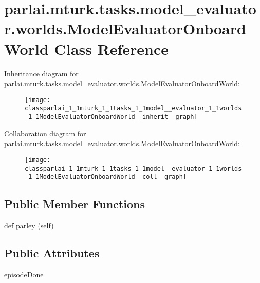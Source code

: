 \hypertarget{classparlai_1_1mturk_1_1tasks_1_1model__evaluator_1_1worlds_1_1ModelEvaluatorOnboardWorld}{}\section{parlai.\+mturk.\+tasks.\+model\+\_\+evaluator.\+worlds.\+Model\+Evaluator\+Onboard\+World Class Reference}
\label{classparlai_1_1mturk_1_1tasks_1_1model__evaluator_1_1worlds_1_1ModelEvaluatorOnboardWorld}


Inheritance diagram for parlai.\+mturk.\+tasks.\+model\+\_\+evaluator.\+worlds.\+Model\+Evaluator\+Onboard\+World\+:
\nopagebreak
\begin{figure}[H]
\begin{center}
\leavevmode
\texttt{[image: classparlai\_1\_1mturk\_1\_1tasks\_1\_1model\_\_evaluator\_1\_1worlds\_1\_1ModelEvaluatorOnboardWorld\_\_inherit\_\_graph]}
\end{center}
\end{figure}


Collaboration diagram for parlai.\+mturk.\+tasks.\+model\+\_\+evaluator.\+worlds.\+Model\+Evaluator\+Onboard\+World\+:
\nopagebreak
\begin{figure}[H]
\begin{center}
\leavevmode
\texttt{[image: classparlai\_1\_1mturk\_1\_1tasks\_1\_1model\_\_evaluator\_1\_1worlds\_1\_1ModelEvaluatorOnboardWorld\_\_coll\_\_graph]}
\end{center}
\end{figure}
\subsection*{Public Member Functions}
\begin{DoxyCompactItemize}
\item 
def \hyperlink{classparlai_1_1mturk_1_1tasks_1_1model__evaluator_1_1worlds_1_1ModelEvaluatorOnboardWorld_a1ac5cd28dd7c3733b9f0ee491f476363}{parley} (self)
\end{DoxyCompactItemize}
\subsection*{Public Attributes}
\begin{DoxyCompactItemize}
\item 
\hyperlink{classparlai_1_1mturk_1_1tasks_1_1model__evaluator_1_1worlds_1_1ModelEvaluatorOnboardWorld_a24629697aabaa6c6127d6cb0681e9cbd}{episode\+Done}
\end{DoxyCompactItemize}



